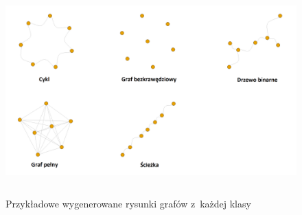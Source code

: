 \begin{figure}[ht]
	\centering
	\includegraphics[height=8cm]{resources/model/images/gen-graphs-generated.png}
	\caption{Przykładowe wygenerowane rysunki grafów z~każdej klasy}
	\label{Fig:tests-generation-1}
\end{figure}
\FloatBarrier